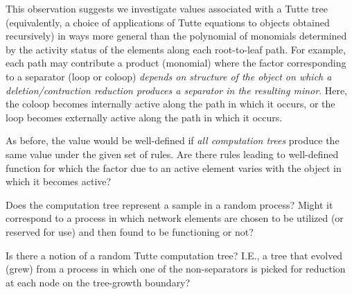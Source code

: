 \documentclass[12pt,leqno]{amsart}
\theoremstyle{remark}
\begin{document}
This observation suggests we investigate values associated
with a Tutte tree (equivalently, a choice of applications
of Tutte equations to objects obtained recursively) in 
ways more general than the polynomial of monomials determined
by the activity status of the elements along each root-to-leaf path.
For example, each path may contribute a product (monomial)
where the factor corresponding to a separator (loop or coloop)
\emph{depends on structure of the object on which
a deletion/contraction reduction produces a separator
in the resulting minor}.   
Here, the coloop becomes  internally active 
along the path in which it occurs, or the loop becomes 
externally active along the path in which it occurs.

As before, the value would be well-defined
if \emph{all computation trees} produce the same
value under the given set of rules.  Are there 
rules leading to well-defined function
for which the factor due to an active element
varies with the object in which it becomes
active?

Does the computation tree represent a sample
in a random process?  Might it correspond to
a process in which network elements are 
chosen to be utilized (or reserved for use)
and then found to be functioning or not?

Is there a notion of a random Tutte computation
tree?  I.E., a tree that evolved (grew) from
a process in which one of the non-separators
is picked for reduction at each node on the
tree-growth boundary?
\end{document}
